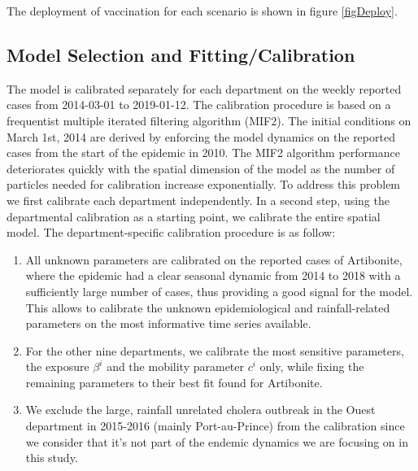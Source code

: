 The deployment of vaccination for each scenario is shown in figure \ref{figDeploy}.


\subsection{Model Selection and Fitting/Calibration}



The model is calibrated separately for each department on the weekly reported cases from 2014-03-01 to 2019-01-12. The calibration procedure is based on a frequentist multiple iterated filtering algorithm (MIF2\cite{Ionides:InferenceDynamicLatent:2015}). The initial conditions on March 1st, 2014 are derived by enforcing the model dynamics on the reported cases from the start of the epidemic in 2010. The MIF2 algorithm performance deteriorates quickly with the spatial dimension of the model as the number of particles needed for calibration increase exponentially\cite{Park:GuidedIntermediateResampling:2017}. To address this problem we first calibrate each department independently. In a second step, using the departmental calibration as a starting point, we calibrate the entire spatial model.
The department-specific calibration procedure is as follow:

\begin{enumerate}
    \item All unknown parameters are calibrated on the reported cases of Artibonite, where the epidemic had a clear seasonal dynamic from 2014 to 2018 with a sufficiently large number of cases, thus providing a good signal for the model.  This allows to calibrate the unknown epidemiological and rainfall-related parameters on the most informative time series available.
    \item For the other nine departments, we calibrate the most sensitive parameters, the exposure $\beta^i$ and the mobility parameter $c^i$ only, while fixing the remaining parameters to their best fit found for Artibonite.
    \item We exclude the large, rainfall unrelated cholera outbreak in the Ouest department in 2015-2016 (mainly Port-au-Prince)\cite{Rebaudet:NationalAlertresponseStrategy:2018} from the calibration since we consider that it's not part of the endemic dynamics we are focusing on in this study.
\end{enumerate}

